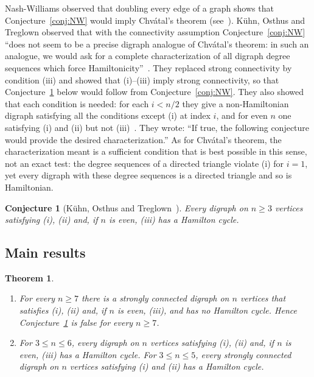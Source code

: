 \documentclass[11pt]{article}
\newtheorem{theorem}{Theorem}
\newtheorem{conjecture}{Conjecture}
\begin{document}
Nash-Williams observed that doubling every edge of a graph shows that Conjecture~\ref{conj:NW} would imply Chvátal's theorem (see~\cite[Section 2]{KOT}). Kühn, Osthus and Treglown observed that with the connectivity assumption Conjecture~\ref{conj:NW} ``does not seem to be a precise digraph analogue of Chvátal's theorem: in such an analogue, we would ask for a complete characterization of all digraph degree sequences which force Hamiltonicity''~\cite[Section 2]{KOT}. They replaced strong connectivity by condition (iii) and showed that (i)--(iii) imply strong connectivity, so that Conjecture~\ref{conj:KOT} below would follow from Conjecture~\ref{conj:NW}. They also showed that each condition is needed: for each $i<n/2$ they give a non-Hamiltonian digraph satisfying all the conditions except (i) at index $i$, and for even $n$ one satisfying (i) and (ii) but not (iii)~\cite[Section 2]{KOT}. They wrote: ``If true, the following conjecture would provide the desired characterization.'' As for Chvátal's theorem, the characterization meant is a sufficient condition that is best possible in this sense, not an exact test: the degree sequences of a directed triangle violate (i) for $i=1$, yet every digraph with these degree sequences is a directed triangle and so is Hamiltonian.

\begin{conjecture}[Kühn, Osthus and Treglown~{\cite[Conjecture 6 of version 1; Conjecture 8 of version 2]{KOT}}]\label{conj:KOT}
Every digraph on $n\ge3$ vertices satisfying (i), (ii) and, if $n$ is even, (iii) has a Hamilton cycle.
\end{conjecture}

\subsection{Main results}

\begin{theorem}\label{thm:main}
\begin{enumerate}
\item[(a)] For every $n\ge7$ there is a strongly connected digraph on $n$ vertices that satisfies (i), (ii) and, if $n$ is even, (iii), and has no Hamilton cycle. Hence Conjecture~\ref{conj:KOT} is false for every $n\ge7$.
\item[(b)] For $3\le n\le6$, every digraph on $n$ vertices satisfying (i), (ii) and, if $n$ is even, (iii) has a Hamilton cycle. For $3\le n\le5$, every strongly connected digraph on $n$ vertices satisfying (i) and (ii) has a Hamilton cycle.
\end{enumerate}
\end{theorem}
\end{document}
